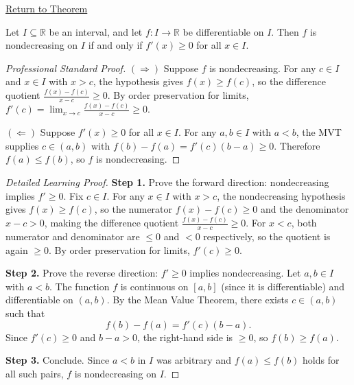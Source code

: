 \newpage
{}
\label{prf:nondecreasing-iff-nonneg-derivative}

\begin{remark*}[Return]
\hyperref[thm:nondecreasing-iff-nonneg-derivative]{Return to Theorem}
\end{remark*}

\begin{theorem*}
Let $I \subseteq \mathbb{R}$ be an interval, and let $f : I \to \mathbb{R}$ be differentiable on $I$. Then $f$ is nondecreasing on $I$ if and only if $f'(x) \geq 0$ for all $x \in I$.
\end{theorem*}

\begin{proof}[Professional Standard Proof]
\LRAProofBodyStart
$(\Rightarrow)$ Suppose $f$ is nondecreasing. For any $c \in I$ and $x \in I$ with $x > c$, the hypothesis gives $f(x) \geq f(c)$, so the difference quotient $\tfrac{f(x)-f(c)}{x-c} \geq 0$. By order preservation for limits, $f'(c) = \lim_{x \to c} \tfrac{f(x)-f(c)}{x-c} \geq 0$.

$(\Leftarrow)$ Suppose $f'(x) \geq 0$ for all $x \in I$. For any $a, b \in I$ with $a < b$, the MVT supplies $c \in (a,b)$ with $f(b) - f(a) = f'(c)(b-a) \geq 0$. Therefore $f(a) \leq f(b)$, so $f$ is nondecreasing.
\end{proof}

\begin{proof}[Detailed Learning Proof]
\LRAProofBodyStart

\textbf{Step 1.} Prove the forward direction: nondecreasing implies $f' \geq 0$. Fix $c \in I$. For any $x \in I$ with $x > c$, the nondecreasing hypothesis gives $f(x) \geq f(c)$, so the numerator $f(x) - f(c) \geq 0$ and the denominator $x - c > 0$, making the difference quotient $\tfrac{f(x)-f(c)}{x-c} \geq 0$. For $x < c$, both numerator and denominator are $\leq 0$ and $< 0$ respectively, so the quotient is again $\geq 0$. By order preservation for limits, $f'(c) \geq 0$.

\textbf{Step 2.} Prove the reverse direction: $f' \geq 0$ implies nondecreasing. Let $a, b \in I$ with $a < b$. The function $f$ is continuous on $[a,b]$ (since it is differentiable) and differentiable on $(a,b)$. By the Mean Value Theorem, there exists $c \in (a,b)$ such that
\[
f(b) - f(a) = f'(c)(b - a).
\]
Since $f'(c) \geq 0$ and $b - a > 0$, the right-hand side is $\geq 0$, so $f(b) \geq f(a)$.

\textbf{Step 3.} Conclude. Since $a < b$ in $I$ was arbitrary and $f(a) \leq f(b)$ holds for all such pairs, $f$ is nondecreasing on $I$.
\end{proof}

